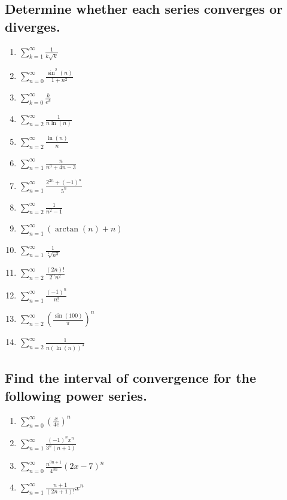 \documentclass{article}
\begin{document}
\subsection{Determine whether each series converges or diverges.}
\begin{multicols}{4}
\begin{enumerate}
\item $\displaystyle \sum_{k=1}^{\infty} \frac{1}{k \sqrt{k}}$
\item $\displaystyle \sum_{n=0}^{\infty} \frac{\sin ^2(n)}{1+n^2}$
\item $\displaystyle \sum_{k=0}^{\infty} \frac{k}{e^k}$
\item $\displaystyle \sum_{n=2}^{\infty} \frac{1}{n \ln (n)}$
\item $\displaystyle \sum_{n=2}^{\infty} \frac{\ln(n)}{n}$
\item $\displaystyle \sum_{n=1}^{\infty} \frac{n}{n^3+4 n-3}$
\item $\displaystyle \sum_{n=1}^{\infty} \frac{2^{2 n}+(-1)^n}{5^n}$
\item $\displaystyle \sum_{n=2}^{\infty} \frac{1}{n^2-1}$
\item $\displaystyle \sum_{n=1}^{\infty}( \arctan(n)+n)$
\item $\displaystyle \sum_{n=1}^{\infty}\frac{1}{\sqrt[4]{n^3}}$
\item $\displaystyle \sum_{n=2}^{\infty}\frac{(2n)!}{2^nn^2}$
\item $\displaystyle \sum_{n=1}^{\infty}\frac{(-1)^n}{n!}$
\item $\displaystyle \sum_{n=2}^{\infty}\left(\frac{\sin(100)}{\pi}\right)^n$
\item $\displaystyle \sum_{n=2}^{\infty}\frac{1}{n(\ln(n))^3}$
\end{enumerate}
\end{multicols}


\subsection{Find the interval of convergence for the following power series.}
\begin{multicols}{4}
\begin{enumerate}
\item $\displaystyle\sum_{n=0}^\infty \left(\frac{x}{4e}\right)^n$
\item $\displaystyle\sum_{n=1}^\infty \frac{(-1)^nx^n}{3^n(n+1)}$
\item $\displaystyle\sum_{n=0}^{\infty} \frac{n^{3 n+1}}{4^{3 n}}(2 x-7)^n$
\item $\displaystyle\sum_{n=1}^{\infty} \frac{n+1}{(2n+1)!}x^n$
\end{enumerate}
\end{multicols}
\end{document}
